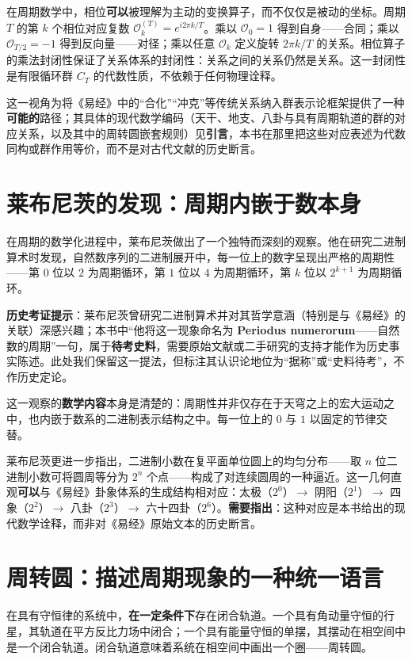 在周期数学中，相位\textbf{可以}被理解为主动的变换算子，而不仅仅是被动的坐标。周期 $T$ 的第 $k$ 个相位对应复数 $\mathcal{O}_k^{(T)} = e^{i2\pi k/T}$。乘以 $\mathcal{O}_0 = 1$ 得到自身——合同；乘以 $\mathcal{O}_{T/2} = -1$ 得到反向量——对径；乘以任意 $\mathcal{O}_k$ 定义旋转 $2\pi k/T$ 的关系。相位算子的乘法封闭性保证了关系体系的封闭性：关系之间的关系仍然是关系。这一封闭性是有限循环群 $C_T$ 的代数性质，不依赖于任何物理诠释。

这一视角为将《易经》中的“合化”“冲克”等传统关系纳入群表示论框架提供了一种\textbf{可能的}路径；其具体的现代数学编码（天干、地支、八卦与具有周期轨道的群的对应关系，以及其中的周转圆嵌套规则）见\textbf{引言}，本书在那里把这些对应表述为代数同构或群作用等价，而不是对古代文献的历史断言。

\section*{莱布尼茨的发现：周期内嵌于数本身}

在周期的数学化进程中，莱布尼茨做出了一个独特而深刻的观察。他在研究二进制算术时发现，自然数序列的二进制展开中，每一位上的数字呈现出严格的周期性——第 $0$ 位以 $2$ 为周期循环，第 $1$ 位以 $4$ 为周期循环，第 $k$ 位以 $2^{k+1}$ 为周期循环。

\textbf{历史考证提示}：莱布尼茨曾研究二进制算术并对其哲学意涵（特别是与《易经》的关联）深感兴趣；本书中“他将这一现象命名为 \textbf{Periodus numerorum}——自然数的周期”一句，属于\textbf{待考史料}，需要原始文献或二手研究的支持才能作为历史事实陈述。此处我们保留这一提法，但标注其认识论地位为“据称”或“史料待考”，不作历史定论。

这一观察的\textbf{数学内容}本身是清楚的：周期性并非仅存在于天穹之上的宏大运动之中，也内嵌于数系的二进制表示结构之中。每一位上的 $0$ 与 $1$ 以固定的节律交替。

莱布尼茨更进一步指出，二进制小数在复平面单位圆上的均匀分布——取 $n$ 位二进制小数可将圆周等分为 $2^n$ 个点——构成了对连续圆周的一种逼近。这一几何直观\textbf{可以}与《易经》卦象体系的生成结构相对应：太极（$2^0$）$\to$ 阴阳（$2^1$）$\to$ 四象（$2^2$）$\to$ 八卦（$2^3$）$\to$ 六十四卦（$2^6$）。\textbf{需要指出}：这种对应是本书给出的现代数学诠释，而非对《易经》原始文本的历史断言。

\section*{周转圆：描述周期现象的一种统一语言}

在具有守恒律的系统中，\textbf{在一定条件下}存在闭合轨道。一个具有角动量守恒的行星，其轨道在平方反比力场中闭合；一个具有能量守恒的单摆，其摆动在相空间中是一个闭合轨道。闭合轨道意味着系统在相空间中画出一个圈——周转圆。


